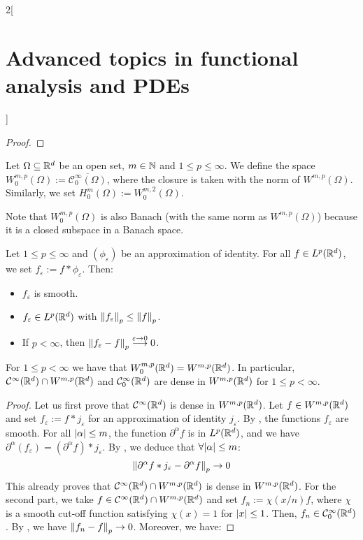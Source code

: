 \documentclass[../../../main_math.tex]{subfiles}
\begin{document}
\begin{multicols}{2}[\section{Advanced topics in functional analysis and PDEs}]
\begin{proof}
  \end{proof}
  \begin{definition}
    Let $\Omega\subseteq \mathbb{R}^d$ be an open set, $m\in\mathbb{N}$ and $1\leq p\leq \infty$. We define the space $W_0^{m,p}(\Omega):=\overline{\mathcal{C}_0^\infty(\Omega)}$, where the closure is taken with the norm of $W^{m,p}(\Omega)$. Similarly, we set $H_0^m(\Omega):=W_0^{m,2}(\Omega)$.
  \end{definition}
  \begin{remark}
    Note that $W_0^{m,p}(\Omega)$ is also Banach (with the same norm as $W^{m,p}(\Omega)$) because it is a closed subspace in a Banach space.
  \end{remark}
  \begin{lemma}\label{ATFAPDE:smooth_convolution}
    Let $1\leq p\leq \infty$ and $(\phi_\varepsilon)$ be an approximation of identity. For all $f\in L^p(\mathbb{R}^d)$, we set $f_\varepsilon:= f*\phi_\varepsilon$. Then:
    \begin{itemize}
      \item $f_\varepsilon$ is smooth.
      \item $f_\varepsilon\in L^p(\mathbb{R}^d)$ with $\left\|f_\varepsilon\right\|_p\leq \left\|f\right\|_p$.
      \item If $p<\infty$, then $\left\|f_\varepsilon-f\right\|_p\overset{\varepsilon\to 0}\longrightarrow 0$.
    \end{itemize}
  \end{lemma}
  \begin{theorem}
    For $1\leq p < \infty$ we have that $W_0^{m,p}(\mathbb{R}^d)=W^{m,p}(\mathbb{R}^d)$. In particular, $\mathcal{C}^\infty(\mathbb{R}^d)\cap W^{m,p}(\mathbb{R}^d)$ and $\mathcal{C}_0^{\infty}(\mathbb{R}^d)$ are dense in $W^{m,p}(\mathbb{R}^d)$ for $1\leq p<\infty$.
  \end{theorem}
  \begin{proof}
    Let us first prove that $\mathcal{C}^\infty(\mathbb{R}^d)$ is dense in $W^{m,p}(\mathbb{R}^d)$. Let $f\in W^{m,p}(\mathbb{R}^d)$ and set $f_\varepsilon:=f*j_\varepsilon$ for an approximation of identity $j_\varepsilon$. By , the functions $f_\varepsilon$ are smooth. For all $\abs{\alpha}\leq m$, the function $\partial^\alpha f$ is in $L^p(\mathbb{R}^d)$, and we have $\partial^\alpha(f_\varepsilon)=(\partial^\alpha f)*j_\varepsilon$. By , we deduce that $\forall\abs{\alpha}\leq m$:
    $$
      \left\|\partial^\alpha f*j_\varepsilon-\partial^\alpha f\right\|_p\to 0
    $$
    This already proves that $\mathcal{C}^\infty(\mathbb{R}^d)\cap W^{m,p}(\mathbb{R}^d)$ is dense in $W^{m,p}(\mathbb{R}^d)$.
    For the second part, we take $f\in \mathcal{C}^\infty(\mathbb{R}^d)\cap W^{m,p}(\mathbb{R}^d)$ and set $f_n:=\chi(x/n)f$, where $\chi$ is a smooth cut-off function satisfying $\chi(x)=1$ for $\abs{x}\leq 1$. Then, $f_n\in \mathcal{C}_0^\infty(\mathbb{R}^d)$. By , we have $\left\|f_n-f\right\|_p\to 0$. Moreover, we have:

\end{proof}
\end{multicols}
\end{document}
